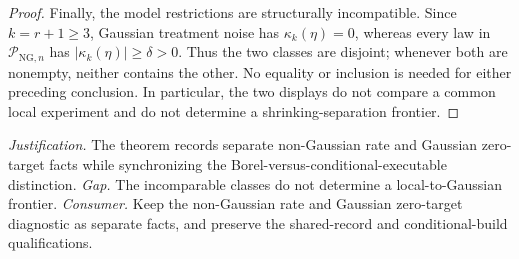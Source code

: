 \documentclass{article}
\begin{document}
\begin{proof}
Finally, the model restrictions are structurally incompatible.  Since
\(k=r+1\ge3\), Gaussian treatment noise has \(\kappa_k(\eta)=0\), whereas
every law in \(\mathcal P_{\mathrm{NG},n}\) has
\(|\kappa_k(\eta)|\ge\delta>0\).  Thus the two classes are disjoint; whenever
both are nonempty, neither contains the other.  No equality or inclusion is
needed for either preceding conclusion.  In particular, the two displays do
not compare a common local experiment and do not determine a
shrinking-separation frontier.
\end{proof}
\par\smallskip\noindent \textit{Justification.} The theorem records separate non-Gaussian rate and Gaussian zero-target facts while synchronizing the Borel-versus-conditional-executable distinction. \textit{Gap.} The incomparable classes do not determine a local-to-Gaussian frontier. \textit{Consumer.} Keep the non-Gaussian rate and Gaussian zero-target diagnostic as separate facts, and preserve the shared-record and conditional-build qualifications.
\end{document}
